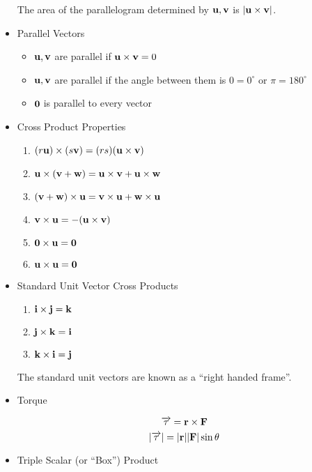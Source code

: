 \begin{itemize}
      The area of the parallelogram determined by $\mathbf{u},\mathbf{v}$ is $|\mathbf{u}\times\mathbf{v}|$.
    
    \item Parallel Vectors
      \begin{itemize}
      \item  $\mathbf{u},\mathbf{v}$ are parallel if $\mathbf{u} \times \mathbf{v} = 0$
      \item $\mathbf{u},\mathbf{v}$ are parallel if the angle between them is $0=0^\circ$ or $\pi = 180^\circ$
      \item $\mathbf{0}$ is parallel to every vector
      \end{itemize}
    
    \item Cross Product Properties
    
      \begin{enumerate}
      \item $(r\mathbf{u}) \times (s\mathbf{v}) = (rs)(\mathbf{u} \times \mathbf{v})$
      \item $\mathbf{u} \times (\mathbf{v} + \mathbf{w}) = \mathbf{u} \times \mathbf{v} + \mathbf{u} \times \mathbf{w}$
      \item $(\mathbf{v} + \mathbf{w}) \times \mathbf{u} = \mathbf{v} \times \mathbf{u} + \mathbf{w} \times \mathbf{u}$
      \item $\mathbf{v} \times \mathbf{u} = -(\mathbf{u} \times \mathbf{v})$
      \item $\mathbf{0} \times \mathbf{u} = \mathbf{0}$
      \item $\mathbf{u} \times \mathbf{u} = \mathbf{0}$
      \end{enumerate}

    \item Standard Unit Vector Cross Products
      \begin{enumerate}
      \item $\mathbf{i} \times \mathbf{j} = \mathbf{k}$
      \item $\mathbf{j} \times \mathbf{k} = \mathbf{i}$
      \item $\mathbf{k} \times \mathbf{i} = \mathbf{j}$
      \end{enumerate}
      The standard unit vectors are known as a ``right handed frame''.
    
    \item Torque
    
    \[\overrightarrow{\tau} = \mathbf{r} \times \mathbf{F} \]
    \[|\overrightarrow{\tau}| = |\mathbf{r}||\mathbf{F}|\sin\theta\]
    
    \item Triple Scalar (or ``Box'') Product
    

\end{itemize}
